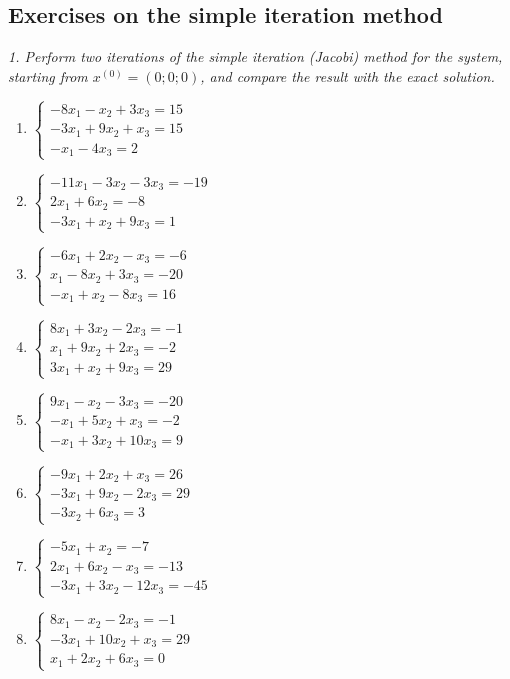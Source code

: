 \subsection{Exercises on the simple iteration method}

\emph{1. Perform two iterations of the simple iteration (Jacobi) method for the system, starting from $x^{(0)}=(0;0;0)$, and compare the result with the exact solution.}

\bigskip
\begin{enumerate}[label=\arabic*., leftmargin=*]
\item $\begin{cases}-8x_1-x_2+3x_3=15\\-3x_1+9x_2+x_3=15\\-x_1-4x_3=2\end{cases}$
\item $\begin{cases}-11x_1-3x_2-3x_3=-19\\2x_1+6x_2=-8\\-3x_1+x_2+9x_3=1\end{cases}$
\item $\begin{cases}-6x_1+2x_2-x_3=-6\\x_1-8x_2+3x_3=-20\\-x_1+x_2-8x_3=16\end{cases}$
\item $\begin{cases}8x_1+3x_2-2x_3=-1\\x_1+9x_2+2x_3=-2\\3x_1+x_2+9x_3=29\end{cases}$
\item $\begin{cases}9x_1-x_2-3x_3=-20\\-x_1+5x_2+x_3=-2\\-x_1+3x_2+10x_3=9\end{cases}$
\item $\begin{cases}-9x_1+2x_2+x_3=26\\-3x_1+9x_2-2x_3=29\\-3x_2+6x_3=3\end{cases}$
\item $\begin{cases}-5x_1+x_2=-7\\2x_1+6x_2-x_3=-13\\-3x_1+3x_2-12x_3=-45\end{cases}$
\item $\begin{cases}8x_1-x_2-2x_3=-1\\-3x_1+10x_2+x_3=29\\x_1+2x_2+6x_3=0\end{cases}$

\end{enumerate}
